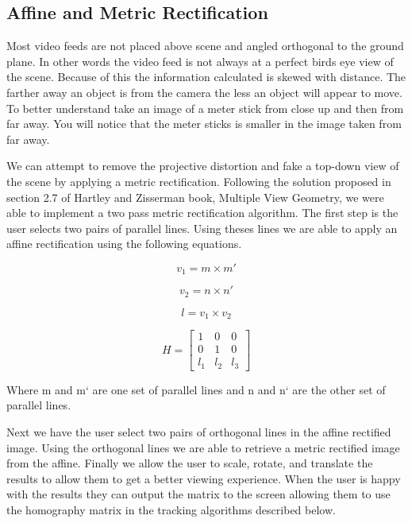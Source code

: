 \documentclass[12pt, twocolumn, conference]{IEEEtran}
\begin{document}
\subsection{Affine and Metric Rectification}

Most video feeds are not placed above scene and angled orthogonal to the ground plane. In other words the video feed is not always at a perfect birds eye view of the scene. Because of this the information calculated is skewed with distance. The farther away an object is from the camera the less an object will appear to move. To better understand take an image of a meter stick from close up and then from far away. You will notice that the meter sticks is smaller in the image taken from far away. 

We can attempt to remove the projective distortion and fake a top-down view of the scene by applying a metric rectification. Following the solution proposed in section 2.7 of Hartley and Zisserman book, Multiple View Geometry, we were able to implement a two pass metric rectification algorithm. The first step is the user selects two pairs of parallel lines. Using theses lines we are able to apply an affine rectification using the following equations.

\begin{equation}
v_1 = m \times m'
\end{equation}

\begin{equation}
v_2 = n \times n'
\end{equation}

\begin{equation}
l = v_1 \times v_2
\end{equation}

\begin{equation}
H =
\begin{bmatrix}
1 & 0 & 0\\ 
0 & 1 & 0\\ 
l_1 & l_2 & l_3 
\end{bmatrix}
\end{equation}

Where m and m` are one set of parallel lines and n  and n` are the other set of parallel lines.

Next we have the user select two pairs of orthogonal lines in the affine rectified image. Using the orthogonal lines we are able to retrieve a metric rectified image from the affine. Finally we allow the user to scale, rotate, and translate the results to allow them to get a better viewing experience. When the user is happy with the results they can output the matrix to the screen allowing them to use the homography matrix in the tracking algorithms described below.
\end{document}
